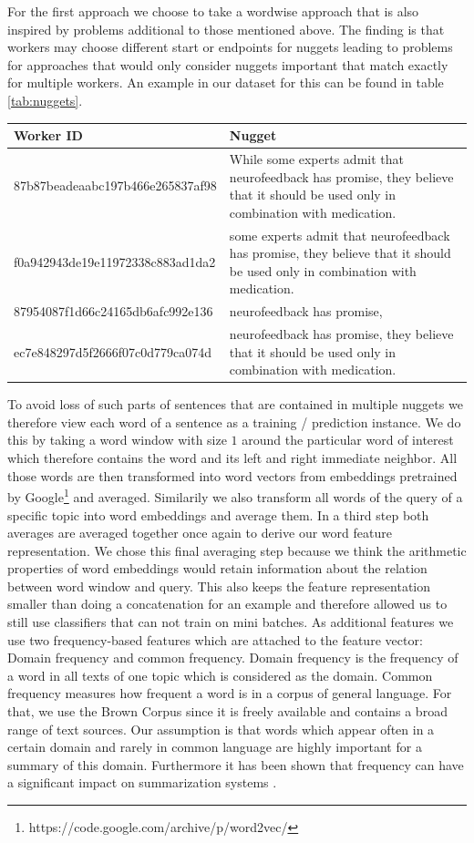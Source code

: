 \documentclass{article}
\begin{document}
For the first approach we choose to take a wordwise approach that is also inspired by problems additional to those mentioned above. The finding is that workers may choose different start or endpoints for nuggets leading to problems for approaches that would only consider nuggets important that match exactly for multiple workers. An example in our dataset for this can be found in table \ref{tab:nuggets}.
\begin{center}
	\begin{tabular}{ | l | p{7cm} |}
		\hline
		Worker ID & Nugget \\ \hline
		87b87beadeaabc197b466e265837af98 &  While some experts admit that neurofeedback has promise, they believe that it should be used only in combination with medication. \\ \hline
		f0a942943de19e11972338c883ad1da2 &  some experts admit that neurofeedback has promise, they believe that it should be used only in combination with medication. \\ \hline

		87954087f1d66c24165db6afc992e136 &  neurofeedback has promise, \\ \hline

		ec7e848297d5f2666f07c0d779ca074d	 &  neurofeedback has promise, they believe that it should be used only in combination with medication. \\
		\hline
	\end{tabular}
\label{tab:nuggets}
\end{center}
To avoid loss of such parts of sentences that are contained in multiple nuggets we therefore view each word of a sentence as a training / prediction instance. We do this by taking a word window with size $1$ around the particular word of interest which therefore contains the word and its left and right immediate neighbor. All those words are then transformed into word vectors from embeddings pretrained by Google\footnote{https://code.google.com/archive/p/word2vec/} and averaged. Similarily we also transform all words of the query of a specific topic into word embeddings and average them. In a third step both averages are averaged together once again to derive our word feature representation. We chose this final averaging step because we think the arithmetic properties of word embeddings would retain information about the relation between word window and query. This also keeps the feature representation smaller than doing a concatenation for an example and therefore allowed us to still use classifiers that can not train on mini batches. As additional features we use two frequency-based features which are attached to the feature vector: Domain frequency and common frequency. Domain frequency is the frequency of a word in all texts of one topic which is considered as the domain. Common frequency measures how frequent a word is in a corpus of general language. For that, we use the Brown Corpus since it is freely available and contains a broad range of text sources. Our assumption is that words which appear often in a certain domain and rarely in common language are highly important for a summary of this domain. Furthermore it has been shown that frequency can have a significant impact on summarization systems \cite{Nenkova05theimpact}.
\end{document}
